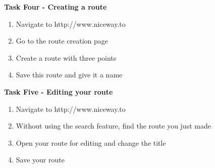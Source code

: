 \begin{Large}\noindent\textbf{Task Four - Creating a route}\end{Large}
\begin{enumerate}
	\item Navigate to http://www.niceway.to
	\item Go to the route creation page
	\item Create a route with three points 
	\item Save this route and give it a name	
\end{enumerate}

\begin{Large}\noindent\textbf{Task Five - Editing your route}\end{Large}
\begin{enumerate}
	\item Navigate to http://www.niceway.to
	\item Without using the search feature, find the route you just made
	\item Open your route for editing and change the title
	\item Save your route
\end{enumerate}